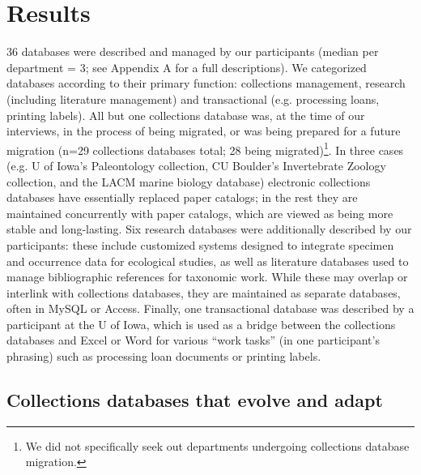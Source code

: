 \section{Results}

36 databases were described and managed by our participants (median per department = 3; see Appendix A for a full descriptions). We categorized databases according to their primary function: collections management, research (including literature management) and transactional (e.g. processing loans, printing labels). All but one collections database was, at the time of our interviews, in the process of being migrated, or was being prepared for a future migration (n=29 collections databases total; 28 being migrated)\footnote{We did not specifically seek out departments undergoing collections database migration.}. In three cases (e.g. U of Iowa’s Paleontology collection, CU Boulder’s Invertebrate Zoology collection, and the LACM marine biology database) electronic collections databases have essentially replaced paper catalogs; in the rest they are maintained concurrently with paper catalogs, which are viewed as being more stable and long-lasting. Six research databases were additionally described by our participants: these include customized systems designed to integrate specimen and occurrence data for ecological studies, as well as literature databases used to manage bibliographic references for taxonomic work. While these may overlap or interlink with collections databases, they are maintained as separate databases, often in MySQL or Access. Finally, one transactional database was described by a participant at the U of Iowa, which is used as a bridge between the collections databases and Excel or Word for various “work tasks” (in one participant’s phrasing) such as processing loan documents or printing labels.

\subsection{Collections databases that evolve and adapt}

